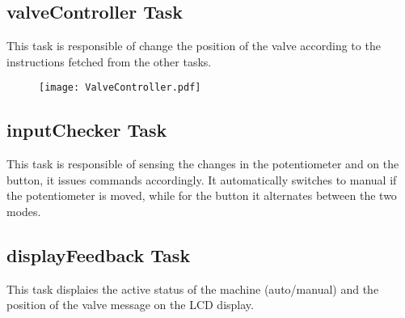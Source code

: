 \subsection{valveController Task}
This task is responsible of change the position of the valve according to the instructions fetched from the other tasks.
\begin{figure}[H]
    \centering
\texttt{[image: ValveController.pdf]}
\end{figure}
\subsection{inputChecker Task}
This task is responsible of sensing the changes in the potentiometer and on the button, it issues commands accordingly.
It automatically switches to manual if the potentiometer is moved, while for the button it alternates between the two modes.
\begin{figure}[H]
    \centering
\end{figure}
\subsection{displayFeedback Task}
This task displaies the active status of the machine (auto/manual) and the position of the valve message on the LCD display.
